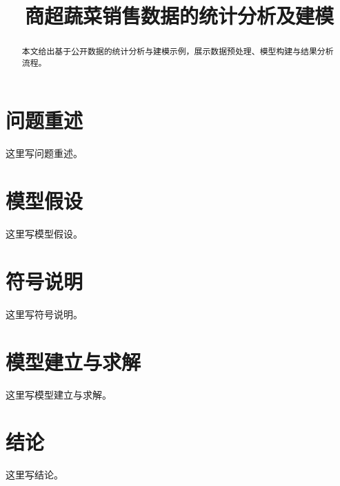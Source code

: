 \documentclass[withoutpreface]{cumcmthesis}
\title{商超蔬菜销售数据的统计分析及建模}
\begin{document}
\maketitle

\begin{abstract}
本文给出基于公开数据的统计分析与建模示例，展示数据预处理、模型构建与结果分析流程。
\end{abstract}

\section{问题重述}
这里写问题重述。

\section{模型假设}
这里写模型假设。

\section{符号说明}
这里写符号说明。

\section{模型建立与求解}
这里写模型建立与求解。

\section{结论}
这里写结论。
\end{document}
